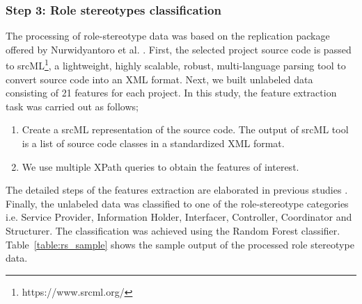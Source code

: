 \documentclass[AMA,Times1COL]{WileyNJDv5} %
\begin{document}
	\subsubsection*{Step 3: Role stereotypes classification}
	The processing of role-stereotype data was based on the replication package offered by Nurwidyantoro et al. \cite{nurwidyantoro2019automated, ho2022role}. First, the selected project source code
	is passed to srcML\footnote{https://www.srcml.org/}, a lightweight, highly scalable, robust, multi-language parsing tool to convert source code into an XML format. Next,
	we built unlabeled data consisting of 21 features for each project. In this study, the feature extraction task was carried out as follows;
	\begin{enumerate}
		\item Create a srcML representation of the source code. The output of srcML tool is a list of source
		code classes in a standardized XML format.
		\item We use multiple XPath queries to obtain the features of interest.
	\end{enumerate}
	The detailed steps of the features extraction are elaborated in previous studies \cite{nurwidyantoro2019automated, ho2022role}. Finally, the unlabeled data was classified to one of the role-stereotype categories i.e.
	Service Provider, Information Holder, Interfacer, Controller, Coordinator and Structurer. The classification was achieved using the Random Forest classifier\cite{nurwidyantoro2019automated, ho2022role}. Table~\ref{table:rs_sample} shows the sample output of the processed role stereotype data.
\end{document}
